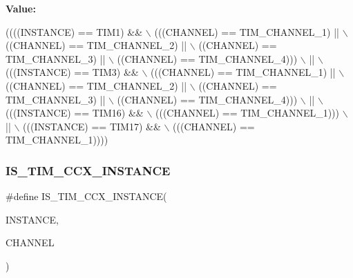{\bfseries Value\+:}
\begin{DoxyCode}
((((INSTANCE) == TIM1) &&                   \(\backslash\)
     (((CHANNEL) == TIM\_CHANNEL\_1) ||          \(\backslash\)
      ((CHANNEL) == TIM\_CHANNEL\_2) ||          \(\backslash\)
      ((CHANNEL) == TIM\_CHANNEL\_3) ||          \(\backslash\)
      ((CHANNEL) == TIM\_CHANNEL\_4)))           \(\backslash\)
    ||                                         \(\backslash\)
    (((INSTANCE) == TIM3) &&                   \(\backslash\)
     (((CHANNEL) == TIM\_CHANNEL\_1) ||          \(\backslash\)
      ((CHANNEL) == TIM\_CHANNEL\_2) ||          \(\backslash\)
      ((CHANNEL) == TIM\_CHANNEL\_3) ||          \(\backslash\)
      ((CHANNEL) == TIM\_CHANNEL\_4)))           \(\backslash\)
    ||                                         \(\backslash\)
    (((INSTANCE) == TIM16) &&                  \(\backslash\)
     (((CHANNEL) == TIM\_CHANNEL\_1)))           \(\backslash\)
    ||                                         \(\backslash\)
    (((INSTANCE) == TIM17) &&                  \(\backslash\)
     (((CHANNEL) == TIM\_CHANNEL\_1))))
\end{DoxyCode}
\mbox{\label{group___exported__macro_ga6517a51ea79512a42bc53c718a77f18e}} 
\subsubsection{\texorpdfstring{I\+S\+\_\+\+T\+I\+M\+\_\+\+C\+C\+X\+\_\+\+I\+N\+S\+T\+A\+N\+CE}{IS\_TIM\_CCX\_INSTANCE}\hspace{0.1cm}{\footnotesize\ttfamily [4/16]}}
{\footnotesize\ttfamily \#define I\+S\+\_\+\+T\+I\+M\+\_\+\+C\+C\+X\+\_\+\+I\+N\+S\+T\+A\+N\+CE(\begin{DoxyParamCaption}\item[{}]{I\+N\+S\+T\+A\+N\+CE,  }\item[{}]{C\+H\+A\+N\+N\+EL }\end{DoxyParamCaption})}

